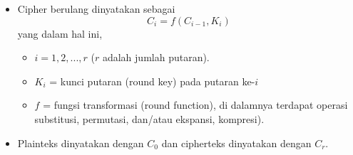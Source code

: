 \documentclass{article}
\begin{document}

\begin{itemize}
    \item Cipher berulang dinyatakan sebagai
    \[ C_i = f(C_{i-1}, K_i) \]
    yang dalam hal ini,
    \begin{itemize}
        \item $i = 1, 2, ..., r$ ($r$ adalah jumlah putaran).
        \item $K_i$ = kunci putaran (round key) pada putaran ke-$i$
        \item $f$ = fungsi transformasi (round function), di dalamnya terdapat operasi substitusi, permutasi, dan/atau ekspansi, kompresi).
    \end{itemize}
    \item Plainteks dinyatakan dengan $C_0$ dan cipherteks dinyatakan dengan $C_r$.
\end{itemize}
\end{document}
